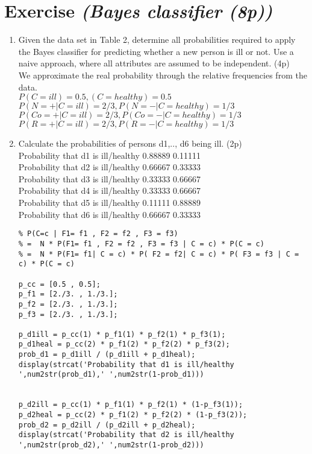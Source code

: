 \documentclass{article}
\begin{document}
\section{Exercise \textit{(Bayes classifier (8p))}}
\begin{enumerate}
    \item Given the data set in Table 2, determine all probabilities required to apply the Bayes classifier for predicting whether a new person is ill or not. Use a naive approach, where all attributes are assumed to be independent. (4p) \\
      We approximate the real probability through the relative frequencies from the data. \\
      $P(C=ill)=0.5, (C=healthy)=0.5$ \\
      $P(N=+|C=ill)=2/3 , P(N=-|C=healthy)=1/3$\\
      $P(Co=+|C=ill)=2/3 , P(Co=-|C=healthy)=1/3$\\    
      $P(R=+|C=ill)=2/3 , P(R=-|C=healthy)=1/3$
   \item Calculate the probabilities of persons d1,.., d6 being ill. (2p) \\ 
   Probability that d1 is ill/healthy 0.88889 0.11111 \\
   Probability that d2 is ill/healthy 0.66667 0.33333 \\
   Probability that d3 is ill/healthy 0.33333 0.66667 \\
   Probability that d4 is ill/healthy 0.33333 0.66667 \\
   Probability that d5 is ill/healthy 0.11111 0.88889 \\
   Probability that d6 is ill/healthy 0.66667 0.33333 \\
   \newpage
   \begin{verbatim}
% P(C=c | F1= f1 , F2 = f2 , F3 = f3) 
% =  N * P(F1= f1 , F2 = f2 , F3 = f3 | C = c) * P(C = c)
% =  N * P(F1= f1| C = c) * P( F2 = f2| C = c) * P( F3 = f3 | C = c) * P(C = c)

p_cc = [0.5 , 0.5];
p_f1 = [2./3. , 1./3.];
p_f2 = [2./3. , 1./3.];
p_f3 = [2./3. , 1./3.];

p_d1ill = p_cc(1) * p_f1(1) * p_f2(1) * p_f3(1); 
p_d1heal = p_cc(2) * p_f1(2) * p_f2(2) * p_f3(2);
prob_d1 = p_d1ill / (p_d1ill + p_d1heal);
display(strcat('Probability that d1 is ill/healthy ',num2str(prob_d1),' ',num2str(1-prob_d1)))


p_d2ill = p_cc(1) * p_f1(1) * p_f2(1) * (1-p_f3(1)); 
p_d2heal = p_cc(2) * p_f1(2) * p_f2(2) * (1-p_f3(2));
prob_d2 = p_d2ill / (p_d2ill + p_d2heal);
display(strcat('Probability that d2 is ill/healthy ',num2str(prob_d2),' ',num2str(1-prob_d2)))


\end{verbatim}
\end{enumerate}
\end{document}
